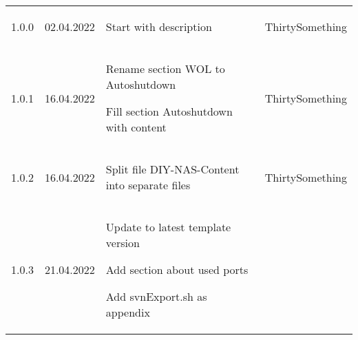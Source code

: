 \begin{tiny}
    \renewcommand*{\arraystretch}{1.5}
    \begin{longtable}{ | p{} | p{} | P{0.49\textwidth} | p{0.15\textwidth} | }
        \hline
             &
                &
         &
                  \\
        \hline
        1.0.0                    &
        02.04.2022               &
        \begin{tsLTItemize}
            \item Start with description
        \end{tsLTItemize}
                                 &
        ThirtySomething            \\
        \hline
        1.0.1                    &
        16.04.2022               &
        \begin{tsLTItemize}
            \item Rename section WOL to Autoshutdown
            \item Fill section Autoshutdown with content
        \end{tsLTItemize}
                                 &
        ThirtySomething            \\
        \hline
        1.0.2                    &
        16.04.2022               &
        \begin{tsLTItemize}
            \item Split file DIY-NAS-Content into separate files
        \end{tsLTItemize}
                                 &
        ThirtySomething            \\
        \hline
        1.0.3                    &
        21.04.2022               &
        \begin{tsLTItemize}
            \item Update to latest template version
            \item Add section about used ports
            \item Add svnExport.sh as appendix
        \end{tsLTItemize}

\end{longtable}
\end{tiny}
